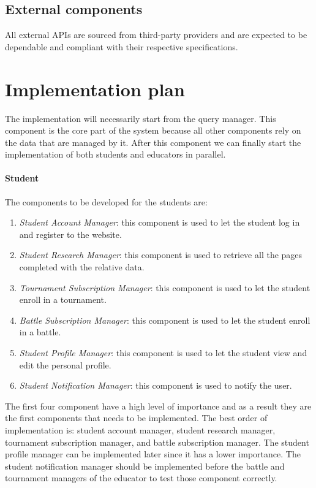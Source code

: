 \documentclass[12pt, a4paper]{report}
\begin{document}
    \subsection{External components}
    All external APIs are sourced from third-party providers and are expected to be dependable and compliant with their respective specifications.

    \section{Implementation plan}
    The implementation will necessarily start from the query manager. 
    This component is the core part of the system because all other components rely on the data that are managed by it. 
    After this component we can finally start the implementation of both students and educators in parallel. 
    
    \paragraph*{Student}
    The components to be developed for the students are: 
    \begin{enumerate}
        \item \textit{Student Account Manager}: this component is used to let the student log in and register to the website. 
        \item \textit{Student Research Manager}: this component is used to retrieve all the pages completed with the relative data. 
        \item \textit{Tournament Subscription Manager}: this component is used to let the student enroll in a tournament.  
        \item \textit{Battle Subscription Manager}: this component is used to let the student enroll in a battle.  
        \item \textit{Student Profile Manager}: this component is used to let the student view and edit the personal profile.
        \item \textit{Student Notification Manager}: this component is used to notify the user. 
    \end{enumerate}
    The first four component have a high level of importance and as a result they are the first components that needs to be implemented. 
    The best order of implementation is: student account manager, student research manager, tournament subscription manager, and battle subscription manager. 
    The student profile manager can be implemented later since it has a lower importance. 
    The student notification manager should be implemented before the battle and tournament managers of the educator to test those component correctly. 
\end{document}
